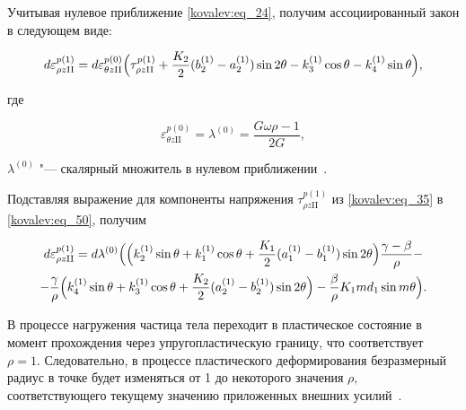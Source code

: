Учитывая нулевое приближение \eqref{kovalev:eq_24}, получим ассоциированный закон в следующем виде:

 \begin{equation}\label{kovalev:eq_50}

  d\varepsilon_{\rho z\mathrm{II}}^{p(1)}=d\varepsilon_{\theta z\mathrm{II}}^{p(0)}

  \Bigl(\tau_{\rho z\mathrm{II}}^{p(1)}+ \frac{K_2}{2} (b_2^{(1)}-a_2^{(1)})\sin2\theta-k_3^{(1)}\cos\theta-k_4^{(1)}\sin\theta\Bigr),

 \end{equation}

где

 \begin{equation}\label{kovalev:eq_51}

  \varepsilon_{\theta z\mathrm{II}}^{p(0)}=\lambda^{(0)}=\frac{G\omega\rho-1}{2G},

 \end{equation}

$\lambda^{(0)}$ "--- скалярный множитель в нулевом приближении~\cite{kovalev:bibl_7}.



Подставляя выражение для компоненты напряжения $\tau_{\rho z\mathrm{II}}^{p(1)}$ из \eqref{kovalev:eq_35} в \eqref{kovalev:eq_50}, получим

 \begin{multline}\label{kovalev:eq_52}

  d\varepsilon_{\rho z\mathrm{II}}^{p(1)}=d\lambda^{(0)}

  \Bigl(\Bigl(k_2^{(1)}\sin\theta+k_1^{(1)}\cos\theta+\frac{K_1}{2}

  (a_1^{(1)}-b_1^{(1)})\sin2\theta\Bigr)

  \frac{\gamma-\beta}{\rho}- \\

  -\frac{\gamma}{\rho}\Bigl(k_4^{(1)}\sin\theta+k_3^{(1)}\cos\theta+

  \frac{K_2}{2} (a_2^{(1)}-b_2^{(1)})\sin2\theta\Bigr)-

  \frac{\beta}{\rho}K_1 md_1\sin m\theta\Bigr).

 \end{multline}



В процессе нагружения частица тела переходит в пластическое состояние в момент прохождения через упругопластическую границу, что соответствует $\rho=1.$ Следовательно, в процессе пластического деформирования безразмерный радиус в точке будет изменяться от 1 до некоторого значения $\rho,$ соответствующего текущему значению приложенных внешних усилий~\cite{kovalev:bibl_10}.




